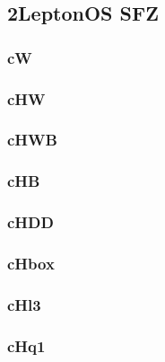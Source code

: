 \documentclass[landscape, 12pt,letterpaper]{article}
\begin{document}
\newpage

\newpage

\subsection{2LeptonOS SFZ}
\subsubsection{cW}


\newpage

\subsubsection{cHW}


\newpage

\subsubsection{cHWB}


\newpage

\subsubsection{cHB}


\newpage

\subsubsection{cHDD}


\newpage

\subsubsection{cHbox}


\newpage

\subsubsection{cHl3}


\newpage

\subsubsection{cHq1}

\end{document}
